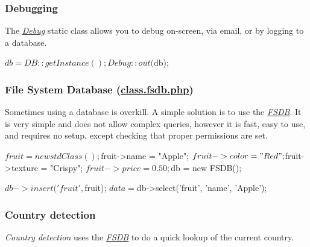 \subsubsection*{Debugging}

The {\itshape \hyperlink{class_debug}{Debug}} static class allows you to debug on-\/screen, via email, or by logging to a database. \begin{DoxyVerb}           $db = DB::getInstance();
           Debug::out($db);
\end{DoxyVerb}


\subsubsection*{File System Database (\hyperlink{class_8fsdb_8php}{class.\-fsdb.\-php})}

Sometimes using a database is overkill. A simple solution is to use the {\itshape \hyperlink{class_f_s_d_b}{F\-S\-D\-B}}. It is very simple and does not allow complex queries, however it is fast, easy to use, and requires no setup, except checking that proper permissions are set. \begin{DoxyVerb}           $fruit = new stdClass();

           $fruit->name = "Apple";
           $fruit->color = "Red";
           $fruit->texture = "Crispy";
           $fruit->price = 0.50;

           $db = new FSDB();

           $db->insert('fruit', $fruit);
           $data = $db->select('fruit', 'name', 'Apple');
\end{DoxyVerb}


\subsubsection*{Country detection}

{\itshape Country detection} uses the {\itshape \hyperlink{class_f_s_d_b}{F\-S\-D\-B}} to do a quick lookup of the current country. 


